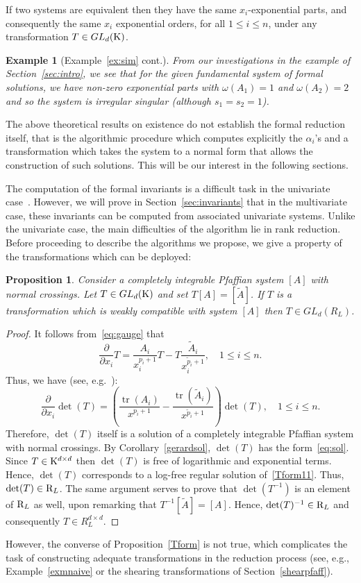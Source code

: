 \documentclass[final,1p,times,number,amsthm]{elsart}
\newtheorem{example}[lemma]{Example}
\newtheorem{proposition}[lemma]{Proposition}
\newcommand{\pder}[2]{\frac{\partial}{\partial #2}#1}
\begin{document}
If two systems are equivalent then they have the same $x_i$-exponential parts,
and consequently the same $x_i$ exponential orders, for all $1 \leq i \leq n$,
under any transformation $T \in GL_d({\rm K})$.
\begin{example}[Example~\ref{ex:sim} cont.]
  From our investigations in the example of Section~\ref{sec:intro}, we see that
  for the given fundamental system of formal solutions, we have non-zero exponential
  parts with $\omega(A_1)=1$ and $\omega(A_2)=2$ and so the system is irregular
  singular (although $s_1 = s_2 =1$).
\end{example}
The above theoretical results on existence do not establish the formal reduction
itself, that is the algorithmic procedure which computes explicitly the
$\alpha_i$'s and a transformation which takes the system to a normal form that
allows the construction of such solutions. This will be our interest in the
following sections.

The computation of the formal invariants is a difficult task in the univariate
case~\cite{key24,B10}. However, we will prove in Section~\ref{sec:invariants} that
in the multivariate case, these invariants can be computed from associated
univariate systems. Unlike the univariate case, the main difficulties of the
algorithm lie in rank reduction. Before proceeding to describe the algorithms we
propose, we give a property of the transformations which can be deployed:
\begin{proposition}
\label{Tform}
Consider a completely integrable Pfaffian system $[A]$ with normal
crossings. Let $T \in GL_d({\rm K})$ and set $T[A] = [\tilde{A}]$. If $T$ is a
transformation which is weakly compatible with system $[A]$ then
$T \in GL_d(R_L)$.
\end{proposition}
\begin{proof}
It follows from~\eqref{eq:gauge} that
$$
 \pder{T}{x_i}  = \frac{A_i}{
    x^{p_i+1}_i} T - T \frac{\tilde{A}_i }{x^{\tilde{p}_i +1}_i} , \quad 1 \leq i \leq n.
$$
Thus, we have (see, e.g.~\cite[Proposition 1, proof, pp 6]{key6}):
\begin{equation}
\label{Tform11}
\pder {\det(T)}{x_i} = ( \frac{\operatorname{tr}(A_i)}{x^{p_i+1}} -
\frac{\operatorname{tr}(\tilde{A}_i)}{x^{\tilde{p}_i+1}}) \det(T) , \quad 1 \leq
i \leq n.
\end{equation}
Therefore, $\det(T)$ itself is a solution of a completely integrable Pfaffian
system with normal crossings. By Corollary~\ref{gerardsol}, $\det(T)$ has the
form~\eqref{eq:sol}. Since $T \in {\rm K}^{d \times d}$ then $\det(T)$ is free
of logarithmic and exponential terms. Hence, $\det(T)$ corresponds to a log-free
regular solution of~\eqref{Tform11}. Thus, $\det(T) \in {\rm R}_L$. The same
argument serves to prove that $\det(T^{-1})$ is an element of ${\rm R}_L$ as
well, upon remarking that $T^{-1}[\tilde{A}] = [A]$. Hence,
$\det(T)^{-1} \in {\rm R}_L$ and consequently $T \in R_L^{d \times d}$.
\end{proof}
However, the converse of Proposition~\eqref{Tform} is not true, which
complicates the task of constructing adequate transformations in the reduction
process (see, e.g., Example~\ref{exmnaive} or the shearing transformations of
Section~\ref{shearpfaff}).
\end{document}
